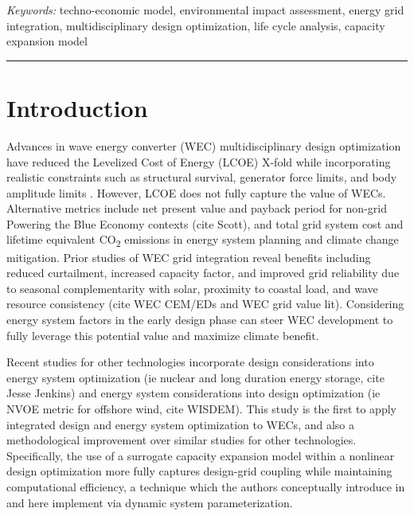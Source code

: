 \documentclass[10pt,twoside]{article}
\begin{document}
\vspace{.5\baselineskip}
\textit{Keywords:} techno-economic model, environmental impact assessment, energy grid integration, multidisciplinary design optimization, life cycle analysis, capacity expansion model

\noindent\rule{\textwidth}{0.4pt}

\section{Introduction}
Advances in wave energy converter (WEC) multidisciplinary design optimization have reduced the Levelized Cost of Energy (LCOE) X-fold while incorporating realistic constraints such as structural survival, generator force limits, and body amplitude limits \cite{mccabe_leveraging_2025}.
However, LCOE does not fully capture the value of WECs.
Alternative metrics include net present value and payback period for non-grid Powering the Blue Economy contexts (cite Scott), and total grid system cost and lifetime equivalent CO\textsubscript{2} emissions in energy system planning and climate change mitigation.
Prior studies of WEC grid integration reveal benefits including reduced curtailment, increased capacity factor, and improved grid reliability due to seasonal complementarity with solar, proximity to coastal load, and wave resource consistency (cite WEC CEM/EDs and WEC grid value lit).
Considering energy system factors in the early design phase can steer WEC development to fully leverage this potential value and maximize climate benefit.

Recent studies for other technologies incorporate design considerations into energy system optimization (ie nuclear and long duration energy storage, cite Jesse Jenkins) and energy system considerations into design optimization (ie NVOE metric for offshore wind, cite WISDEM).
This study is the first to apply integrated design and energy system optimization to WECs, and also a methodological improvement over similar studies for other technologies. 
Specifically, the use of a surrogate capacity expansion model within a nonlinear design optimization more fully captures design-grid coupling while maintaining computational efficiency, a technique which the authors conceptually introduce in \cite{mccabe_system_2023} and here implement via dynamic system parameterization.
\end{document}
